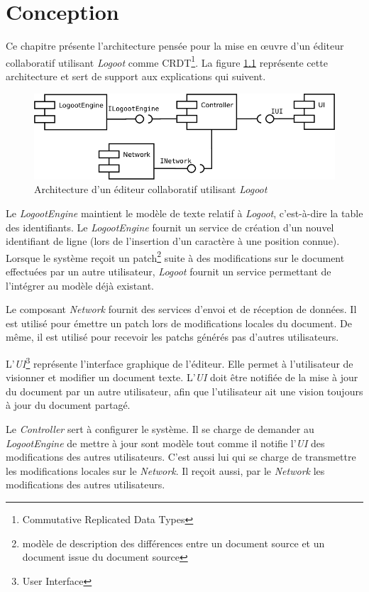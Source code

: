 \chapter{Conception}
  Ce chapitre présente l'architecture pensée pour la mise en \oe{}uvre d'un
  éditeur collaboratif utilisant \emph{Logoot} comme CRDT\footnote{Commutative
  Replicated Data Types}. La figure \ref{fig:architecture} représente cette
  architecture et sert de support aux explications qui suivent.

  \begin{figure}[h]
    \label{fig:architecture}
    \includegraphics[width=\textwidth]{includes/architecture.png}
    \caption{Architecture d'un éditeur collaboratif utilisant \emph{Logoot}}
  \end{figure}

  Le \emph{LogootEngine} maintient le modèle de texte relatif à \emph{Logoot},
  c'est-à-dire la table des identifiants. Le \emph{LogootEngine} fournit un
  service de création d'un nouvel identifiant de ligne (lors de l'insertion
  d'un caractère à une position connue). Lorsque le système reçoit un
  patch\footnote{modèle de
  description des différences entre un document source et un document issue du
  document source} suite à des modifications sur le document effectuées par un
  autre utilisateur, \emph{Logoot} fournit un service permettant de l'intégrer
  au modèle déjà existant.

  Le composant \emph{Network} fournit des services d'envoi et de réception de
  données. Il est utilisé pour émettre un patch lors de modifications locales
  du document. De même, il est utilisé pour recevoir les patchs générés pas
  d'autres utilisateurs.

  L'\emph{UI}\footnote{User Interface} représente l'interface graphique de
  l'éditeur. Elle permet à l'utilisateur de visionner et modifier un document
  texte. L'\emph{UI} doit être notifiée de la mise à jour du document par un
  autre utilisateur, afin que l'utilisateur ait une vision toujours à jour
  du document partagé.

  Le \emph{Controller} sert à configurer le système. Il se charge de demander
  au \emph{LogootEngine} de mettre à jour sont modèle tout comme il notifie
  l'\emph{UI} des modifications des autres utilisateurs. C'est aussi lui qui se
  charge de transmettre les modifications locales sur le \emph{Network}. Il
  reçoit aussi, par le \emph{Network} les modifications des autres utilisateurs.

